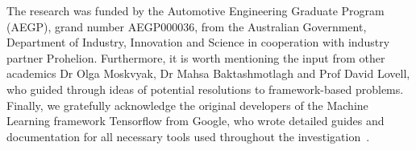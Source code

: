 The research was funded by the Automotive Engineering Graduate Program (AEGP), grand number AEGP000036, from the Australian
Government, Department of Industry, Innovation and Science in cooperation with industry partner Prohelion.
Furthermore, it is worth mentioning the input from other academics Dr Olga Moskvyak, Dr Mahsa Baktashmotlagh and Prof David Lovell, who guided through ideas of potential resolutions to framework-based problems.
Finally, we gratefully acknowledge the original developers of the Machine Learning framework Tensorflow from Google, who wrote detailed guides and documentation for all necessary tools used throughout the investigation~\cite{tensorflow2015-whitepaper}.
